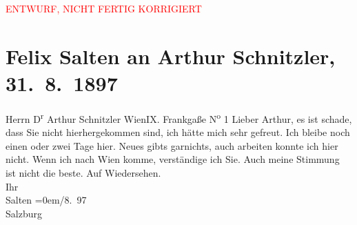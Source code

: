 
\begin{center}
            \textcolor{red}{ENTWURF, NICHT FERTIG KORRIGIERT}
                      \end{center}
            
         \renewcommand{\erwaehnteOrte}{Orte: Frankgasse, Salzburg, Wien}
         \renewcommand{\erwaehnteWerke}{}
               \section[Felix Salten an Arthur Schnitzler, 31. 8. 1897]{ Felix Salten an Arthur Schnitzler, 31. 8. 1897}\nopagebreak{}\rehead{ }\begin{ledgroupsized}[t]{13cm}\normalsize\beginnumbering \toendnotes[C]{\smallbreak\pagebreak[2]} 
\pstart{}{\pb}Herrn D\textsuperscript{r} Arthur Schnitzler \pend{}\pstart{}Wien\pend{}\pstart{}IX. Frankgaße N\textsuperscript{o} 1\pend{}{\bigskip}\pstart
           \noindent{}{\pb}Lieber Arthur, es ist schade, dass Sie nicht hierhergekommen sind,
               ich hätte mich sehr gefreut. Ich bleibe noch einen oder zwei Tage hier. Neues gibts
               garnichts, auch arbeiten konnte ich hier nicht.\pend
           \pstart
           Wenn ich nach Wien komme, verständige ich Sie.
               Auch meine Stimmung ist nicht die beste.\pend
           \pstart
           Auf Wiedersehen. {\\[\baselineskip]}Ihr {\\[\baselineskip]}\spacefill\mbox{Salten}\pend
           \leftskip=0em{}/8. 97{\\}Salzburg\pend
           
         
         \endnumbering{}\end{ledgroupsized}\begin{anhang}\end{anhang}\newcommand{\dateiname}{L03273}\newcommand{\titel}{Felix Salten an Arthur Schnitzler, 31. 8. 1897}\newcommand{\editorInnen}{Martin Anton Müller und Laura Untner}
      